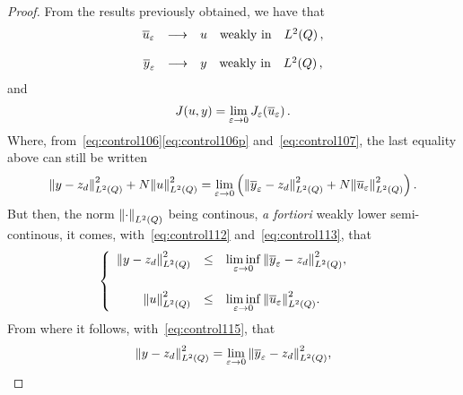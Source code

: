 \begin{proof}%
    From the results previously obtained, we have that
    \begin{equation}\label{eq:control112}
        \begin{array}{rclll}
            {\overline{u}}_{\varepsilon} & \longrightarrow & u & \text{weakly in} & L^{2}\!\left({Q}\right),
        \end{array}
    \end{equation}

    \begin{equation}\label{eq:control113}
        \begin{array}{rcllll}
            {\overline{y}}_{\varepsilon} & \longrightarrow & y & \text{weakly in} & L^{2}\!\left({Q}\right),
        \end{array}
    \end{equation}
    and
    \begin{equation*}
        J(u,y) = \lim_{\varepsilon\to 0}J_{\varepsilon}\!\left({{\overline{u}}_{\varepsilon}}\right).
    \end{equation*}
    Where, from~\eqref{eq:control106}\eqref{eq:control106p}
    and~\eqref{eq:control107}, the last equality above can still be written
    \begin{equation}\label{eq:control115}
        \normecq{y - z_{d}} + N\normecq{u} = \lim_{\veps\to 0}\left({%
            \normecq{\bareps{y} - z_{d}} + N\normecq{\bareps{u}}
        }\right).
    \end{equation}
    But then, the norm ${\left\|{\cdot }\right\|}_{L^{2}\left({Q}\right)}$ being continous, \textit{a
    fortiori} weakly lower semi-continous, it comes,
    with~\eqref{eq:control112} and~\eqref{eq:control113}, that
    \begin{equation*}
        \begin{cases}\displaystyle
            \begin{array}{rcll}
                {\left\|{y - z_{d} }\right\|}_{L^{2}\left({Q}\right)}^{2} & \leq & \underset{\varepsilon\to
                0}{\lim\inf}\, {\left\|{{\overline{y}}_{\varepsilon} - z_{d} }\right\|}_{L^{2}\left({Q}\right)}^{2},\\
                \\
                {\left\|{u }\right\|}_{L^{2}\left({Q}\right)}^{2} & \leq & \underset{\varepsilon\to 0}{\lim\inf}\,
                {\left\|{{\overline{u}}_{\varepsilon} }\right\|}_{L^{2}\left({Q}\right)}^{2}.
            \end{array}
        \end{cases}
    \end{equation*}
    From where it follows, with~\eqref{eq:control115}, that
    \begin{equation}\label{eq:control118}
        \normecq{y -z_{d}} = \lim_{\veps\to 0}\normecq{\bareps{y} - z_{d}},

\end{equation}
\end{proof}

